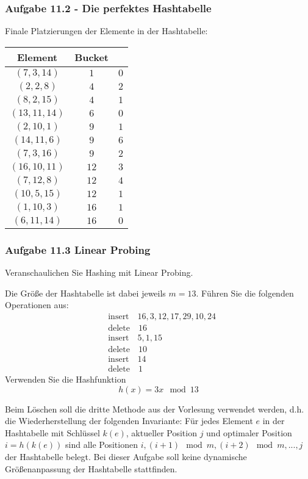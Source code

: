 \documentclass{beamer}
\begin{document}
\begin{frame}
	\frametitle{Aufgabe 11.2 - Die perfektes Hashtabelle}
	\small
	Finale Platzierungen der Elemente in der Hashtabelle:
	\begin{table}
		\centering
		\small
		\begin{tabular}{c|c|c}
			Element        & Bucket &     \\
			\hline
			$(7, 3, 14)$   & $1$    & $0$ \\
			$(2, 2, 8)$    & $4$    & $2$ \\
			$(8, 2, 15)$   & $4$    & $1$ \\
			$(13, 11, 14)$ & $6$    & $0$ \\
			$(2, 10, 1)$   & $9$    & $1$ \\
			$(14, 11, 6)$  & $9$    & $6$ \\
			$(7, 3, 16)$   & $9$    & $2$ \\
			$(16, 10, 11)$ & $12$   & $3$ \\
			$(7, 12, 8)$   & $12$   & $4$ \\
			$(10, 5, 15)$  & $12$   & $1$ \\
			$(1, 10, 3)$   & $16$   & $1$ \\
			$(6, 11, 14)$  & $16$   & $0$ \\
		\end{tabular}
	\end{table}
\end{frame}

\begin{frame}
	\frametitle{Aufgabe 11.3 Linear Probing}
	\scriptsize
	Veranschaulichen Sie Hashing mit Linear Probing.

	\smallskip
	Die Größe der Hashtabelle ist dabei jeweils $m = 13$. Führen Sie die folgenden Operationen aus:
	\begin{align*}
		 & \text{insert} \quad 16, 3, 12, 17, 29, 10, 24   \\
		 & \text{delete} \quad 16                          \\
		 & \text{insert} \quad 5, 1,                    15 \\
		 & \text{delete} \quad 10                          \\
		 & \text{insert} \quad 14                          \\
		 & \text{delete} \quad 1
	\end{align*}
	Verwenden Sie die Hashfunktion
	$$h(x) = 3x \mod 13$$

	Beim Löschen soll die dritte Methode aus der Vorlesung verwendet werden, d.h. die Wiederherstellung der folgenden Invariante: Für jedes Element $e$ in der Hashtabelle mit Schlüssel
	$k(e)$, aktueller Position $j$ und optimaler Position $i = h(k(e))$ sind alle Positionen $i,(i + 1) \mod m,(i + 2) \mod m, . . . , j$ der Hashtabelle belegt.
	Bei dieser Aufgabe soll keine dynamische Größenanpassung der Hashtabelle stattfinden.
\end{frame}
\end{document}

